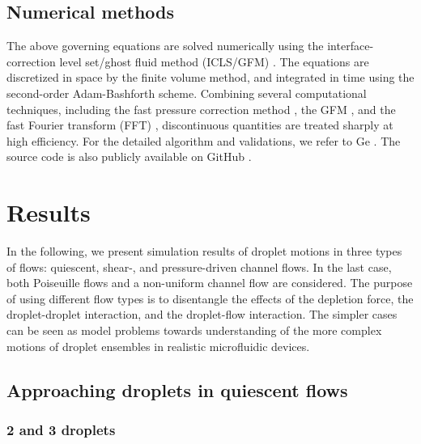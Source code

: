 \subsection{Numerical methods}

The above governing equations are solved numerically using the interface-correction level set/ghost fluid method (ICLS/GFM) \cite{ICLS}. The equations are discretized in space by the finite volume method, and integrated in time using the second-order Adam-Bashforth scheme. Combining several computational techniques, including the fast pressure correction method \cite{Dodd_JCP_2014}, the GFM \cite{Fedkiw_JCP_1999}, and the fast Fourier transform (FFT) \cite{Schumann_JCP_1988}, discontinuous quantities are treated sharply at high efficiency. For the detailed algorithm and validations, we refer to Ge \etal \cite{ICLS}. The source code is also publicly available on GitHub \cite{icls_code}.

\section{Results}

In the following, we present simulation results of droplet motions in three types of flows: quiescent, shear-, and pressure-driven channel flows. In the last case, both Poiseuille flows and a non-uniform channel flow are considered. The purpose of using different flow types is to disentangle the effects of the depletion force, the droplet-droplet  interaction, and the droplet-flow interaction. The simpler cases can be seen as model problems towards understanding of the more complex motions of droplet ensembles in realistic microfluidic devices.

\subsection{Approaching droplets in quiescent flows} \label{sec:quiescent}
\subsubsection{2 and 3 droplets}

